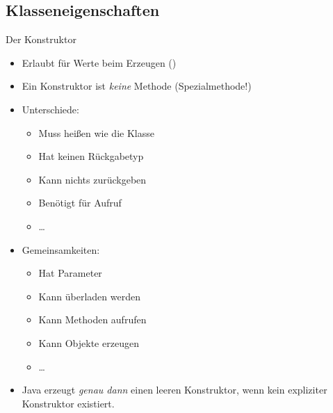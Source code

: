\subsection{Klasseneigenschaften}
\begin{frame}{Der Konstruktor}
\begin{itemize}[<+(1)->]
   \itemsep6pt
   \item Erlaubt für Werte beim Erzeugen ()
   \item Ein Konstruktor ist \textit{keine} Methode (Spezialmethode!)\vspace*{-\topsep}
\end{itemize}
\begin{multicols}{2}
\begin{itemize}[<+(1)->]
   \item Unterschiede: \begin{itemize}
      \item Muss heißen wie die Klasse
      \item Hat keinen Rückgabetyp
      \item Kann nichts zurückgeben
      \item Benötigt  für Aufruf
      \item \ldots
   \end{itemize}
   \item Gemeinsamkeiten:
   \begin{itemize}
      \item Hat Parameter
      \item Kann überladen werden
      \item Kann Methoden aufrufen
      \item Kann Objekte erzeugen
      \item \ldots
   \end{itemize}
\end{itemize}
\end{multicols}
\begin{itemize}[<+(1)->]
   \item Java erzeugt \textit{genau dann} einen leeren Konstruktor, wenn kein expliziter Konstruktor existiert.
\end{itemize}
\end{frame}


